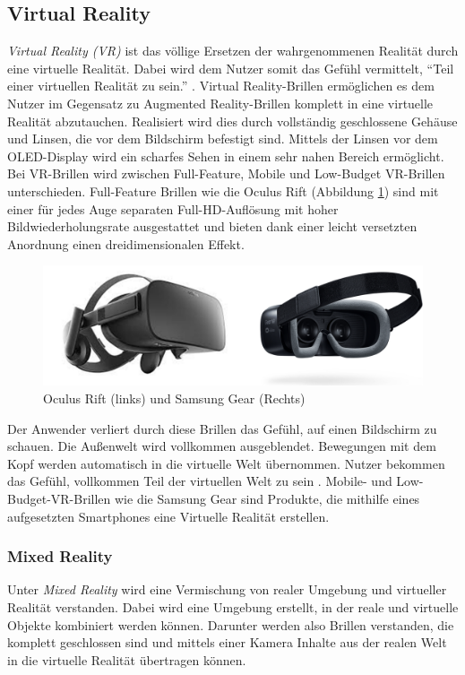 \subsection{Virtual Reality}
%
\emph{Virtual Reality (VR)} ist das völlige Ersetzen der wahrgenommenen Realität durch eine virtuelle Realität. Dabei wird dem Nutzer somit das Gefühl vermittelt, \enquote{Teil einer virtuellen Realität zu sein.} \cite[S.~22]{ThomasDirkMetzgerHelmutNiegemannHrsg2018}. Virtual Reality-Brillen ermöglichen es dem Nutzer im Gegensatz zu Augmented Reality-Brillen komplett in eine virtuelle Realität abzutauchen. 
%
%
Realisiert wird dies durch vollständig geschlossene Gehäuse und Linsen, die vor dem Bildschirm befestigt sind. Mittels der Linsen vor dem OLED-Display wird ein scharfes Sehen in einem sehr nahen Bereich ermöglicht. Bei VR-Brillen wird zwischen Full-Feature, Mobile und Low-Budget VR-Brillen unterschieden. Full-Feature Brillen wie die Oculus Rift (Abbildung \ref{fig:OculusRift}) sind mit einer für jedes Auge separaten Full-HD-Auflösung mit hoher Bildwiederholungsrate ausgestattet und bieten dank einer leicht versetzten Anordnung einen dreidimensionalen Effekt. 
%
\begin{figure}[htbp]
    \centering
    \includegraphics[width=1\textwidth]{data/bilder/Rift_Gear.pdf}
    \caption{Oculus Rift \cite{Oculus2018} (links) und Samsung Gear \cite{Samsung2018} (Rechts)}
    \label{fig:OculusRift}
\end{figure}
%

Der Anwender verliert durch diese Brillen das Gefühl, auf einen Bildschirm zu schauen. Die Außenwelt wird vollkommen ausgeblendet. Bewegungen mit dem Kopf werden automatisch in die virtuelle Welt übernommen. Nutzer bekommen das Gefühl, vollkommen Teil der virtuellen Welt zu sein \cite[S.~22ff]{ThomasDirkMetzgerHelmutNiegemannHrsg2018}. Mobile- und Low-Budget-VR-Brillen wie die Samsung Gear sind Produkte, die mithilfe eines aufgesetzten Smartphones eine Virtuelle Realität erstellen.


%
\subsubsection{Mixed Reality}
%
Unter \emph{Mixed Reality} wird eine Vermischung von realer Umgebung und virtueller Realität verstanden. Dabei wird eine Umgebung erstellt, in der reale und virtuelle Objekte kombiniert werden können. Darunter werden also Brillen verstanden, die komplett geschlossen sind und mittels einer Kamera Inhalte aus der realen Welt in die virtuelle Realität übertragen können.
%

